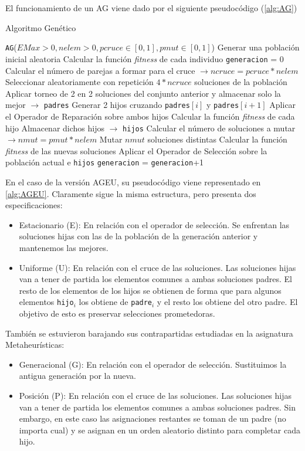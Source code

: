 El funcionamiento de un AG viene dado por el siguiente pseudocódigo (\ref{alg:AG})

\begin{algorithm}[H]
\caption{Algoritmo Genético}\label{alg:AG}
\begin{algorithmic}[1]
\Procedure \texttt{AG}($EMax > 0, nelem > 0, pcruce \in [0,1], pmut \in [0,1]$)
\State Generar una población inicial aleatoria
\State Calcular la función \textit{fitness} de cada individuo
\State \texttt{generacion} = 0
	\State Calcular el número de parejas a formar para el cruce $\xrightarrow{}{} ncruce = pcruce*nelem$
	\State Seleccionar aleatoriamente con repetición $4*ncruce$ soluciones de la población
	\State Aplicar torneo de 2 en 2 soluciones del conjunto anterior y almacenar solo la mejor $\xrightarrow{}{}$ \texttt{padres}
		\State Generar 2 hijos cruzando \texttt{padres}$[i]$ y \texttt{padres}$[i+1]$
		\State Aplicar el Operador de Reparación sobre ambos hijos
		\State Calcular la función \textit{fitness} de cada hijo
		\State Almacenar dichos hijos $\xrightarrow{}{}$ \texttt{hijos}
	\EndFor	
	\State Calcular el número de soluciones a mutar $\xrightarrow{}{} nmut = pmut*nelem$
	\State Mutar $nmut$ soluciones distintas
	\State Calcular la función \textit{fitness} de las nuevas soluciones
	\State Aplicar el Operador de Selección sobre la población actual e \texttt{hijos}
	\State \texttt{generacion} = \texttt{generacion}+1
\EndWhile
\EndProcedure
\end{algorithmic}
\end{algorithm}

En el caso de la versión AGEU, su pseudocódigo viene representado en \ref{alg:AGEU}. 
Claramente sigue la misma estructura, pero presenta dos especificaciones:
\begin{itemize}
	\item Estacionario (E): En relación con el operador de selección. 
Se enfrentan las soluciones hijas con las de la población de la generación anterior y mantenemos las mejores. 
	\item Uniforme (U): En relación con el cruce de las soluciones. 
Las soluciones hijas van a tener de partida los elementos comunes a ambas soluciones padres. 
El resto de los elementos de los hijos se obtienen de forma que para algunos elementos \texttt{hijo$_i$} los obtiene de \texttt{padre$_i$} y el resto los obtiene del otro padre. 
El objetivo de esto es preservar selecciones prometedoras.	
\end{itemize}
También se estuvieron barajando sus contrapartidas estudiadas en la asignatura Metaheurísticas:
\begin{itemize}
	\item Generacional (G): En relación con el operador de selección. 
Sustituimos la antigua generación por la nueva. 
	\item Posición (P): En relación con el cruce de las soluciones. 
Las soluciones hijas van a tener de partida los elementos comunes a ambas soluciones padres. 
Sin embargo, en este caso las asignaciones restantes se toman de un padre (no importa cual) y se asignan en un orden aleatorio distinto para completar cada hijo. 
\end{itemize}

